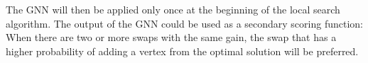 \documentclass[draft,final]{vutinfth} %
\begin{document}
The GNN will then be applied only once at the beginning of the local search algorithm. The output of the GNN could be used as a secondary scoring function: When there are two or more swaps with the same gain, the swap that has a higher probability of adding a vertex from the optimal solution will be preferred. 




\end{document}
